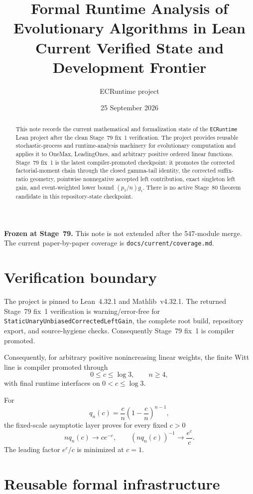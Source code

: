 \documentclass[11pt]{article}
\title{Formal Runtime Analysis of Evolutionary Algorithms in Lean\\
\large Current Verified State and Development Frontier}
\author{ECRuntime project}
\date{25 September 2026}
\begin{document}
\maketitle

\noindent\textbf{Frozen at Stage~79.} This note is not extended after the 547-module
merge. The current paper-by-paper coverage is \texttt{docs/current/coverage.md}.

\begin{abstract}
This note records the current mathematical and formalization state of the
\texttt{ECRuntime} Lean project after the clean Stage~79 fix~1 verification. The project
provides reusable stochastic-process and runtime-analysis machinery for evolutionary
computation and applies it to OneMax, LeadingOnes, and arbitrary positive ordered linear
functions. Stage~79 fix~1 is the latest compiler-promoted checkpoint: it promotes the
corrected factorial-moment chain through the closed gamma-tail identity, the corrected
suffix-ratio geometry, pointwise nonnegative accepted left contribution, exact singleton
left gain, and event-weighted lower bound $(p_1/n)g_i$. There is no active Stage~80
theorem candidate in this repository-state checkpoint.
\end{abstract}

\section{Verification boundary}

The project is pinned to Lean~4.32.1 and Mathlib~v4.32.1. The returned Stage~79 fix~1 verification is warning/error-free for \texttt{StaticUnaryUnbiasedCorrectedLeftGain}, the complete root build, repository export, and source-hygiene checks. Consequently Stage~79 fix~1 is compiler promoted.

Consequently, for arbitrary positive nonincreasing linear weights, the finite Witt line
is compiler promoted through
\[
  0\le c\le\log 3,\qquad n\ge4,
\]
with final runtime interfaces on $0<c\le\log3$.

For
\[
  q_n(c)=\frac{c}{n}\left(1-\frac{c}{n}\right)^{n-1},
\]
the fixed-scale asymptotic layer proves for every fixed $c>0$
\[
  n q_n(c)\longrightarrow c e^{-c},
  \qquad
  (nq_n(c))^{-1}\longrightarrow \frac{e^c}{c}.
\]
The leading factor $e^c/c$ is minimized at $c=1$.

\section{Reusable formal infrastructure}
\end{document}
